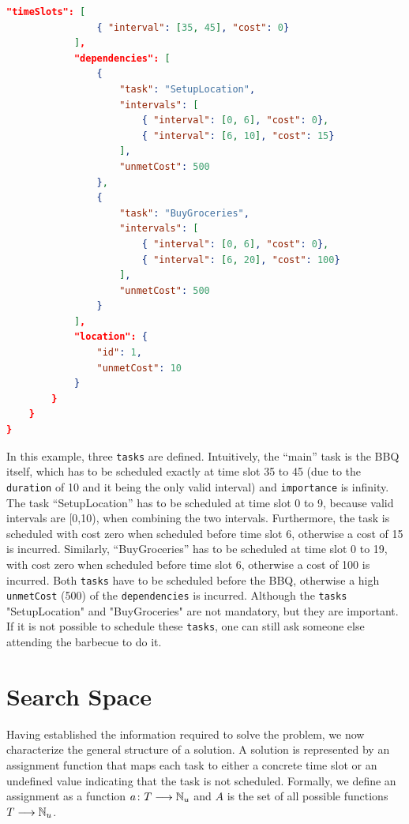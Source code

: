 \begin{example}
\begin{lstlisting}[language=json]
            "timeSlots": [
                { "interval": [35, 45], "cost": 0}
            ],
            "dependencies": [
                { 
                    "task": "SetupLocation",
                    "intervals": [
                        { "interval": [0, 6], "cost": 0},
                        { "interval": [6, 10], "cost": 15}
                    ],
                    "unmetCost": 500
                },
                { 
                    "task": "BuyGroceries",
                    "intervals": [
                        { "interval": [0, 6], "cost": 0},
                        { "interval": [6, 20], "cost": 100}
                    ],
                    "unmetCost": 500
                }
            ],
            "location": {
                "id": 1,
                "unmetCost": 10
            }
        }
    }
}
\end{lstlisting}
      In this example, three \texttt{tasks} are defined. Intuitively, the ``main'' task is the \ac{BBQ} itself, which has to be scheduled exactly at time slot 35 to 45 (due to the \texttt{duration} of 10 and it being the only valid interval) and \texttt{importance} is infinity. The task ``SetupLocation'' has to be scheduled at time slot 0 to 9, because valid intervals are [0,10), when combining the two intervals. Furthermore, the task is scheduled with cost zero when scheduled before time slot 6, otherwise a cost of 15 is incurred. Similarly, ``BuyGroceries'' has to be scheduled at time slot 0 to 19, with cost zero when scheduled before time slot 6, otherwise a cost of 100 is incurred. Both \texttt{tasks} have to be scheduled before the \ac{BBQ}, otherwise a high \texttt{unmetCost} (500) of the \texttt{dependencies} is incurred. Although the \texttt{tasks} "SetupLocation" and "BuyGroceries" are not mandatory, but they are important. If it is not possible to schedule these \texttt{tasks}, one can still ask someone else attending the barbecue to do it.
\end{example}

\section{Search Space}
\label{sec:formal-framework:search-space}
Having established the information required to solve the problem, we now characterize the general structure of a solution. A solution is represented by an assignment function that maps each task to either a concrete time slot or an undefined value indicating that the task is not scheduled. Formally, we define an assignment as a function  $a \colon T \longrightarrow \mathbb{N}_u$ and $A$ is the set of all possible functions $T \longrightarrow \mathbb{N}_u$.

